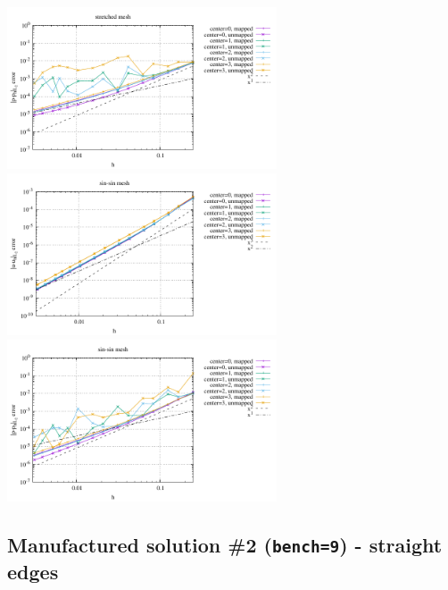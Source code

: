 \begin{center}
\includegraphics[width=8cm]{python_codes/fieldstone_76/results/bench1/curved/errors_P_mt4.pdf}\\
\includegraphics[width=8cm]{python_codes/fieldstone_76/results/bench1/curved/errors_V_mt5.pdf}
\includegraphics[width=8cm]{python_codes/fieldstone_76/results/bench1/curved/errors_P_mt5.pdf}
\end{center}

\newpage
\subsection*{Manufactured solution \#2 ({\tt bench=9}) - straight edges}

